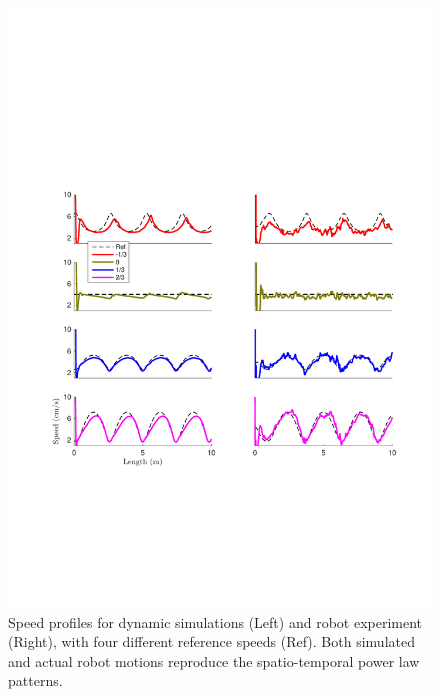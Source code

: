 \begin{figure}[ht]
	\centering
	\includegraphics[trim=2cm 7cm 1cm 9.1cm, clip=true,keepaspectratio,width=0.8\linewidth]{./figures/Fig5g_DSspeedprofilesBoth.pdf}
	\caption{Speed profiles for dynamic simulations (Left) and robot experiment (Right), with four different reference speeds (Ref). Both simulated and actual robot motions reproduce the spatio-temporal power law patterns.}
	\label{fig:5g}
\end{figure}




